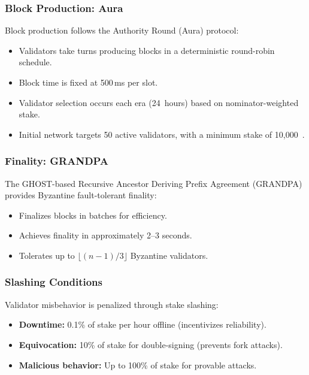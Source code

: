 \subsubsection{Block Production: Aura}

Block production follows the Authority Round (Aura) protocol:
\begin{itemize}[nosep]
    \item Validators take turns producing blocks in a deterministic round-robin schedule.
    \item Block time is fixed at 500\,ms per slot.
    \item Validator selection occurs each era (24~hours) based on nominator-weighted stake.
    \item Initial network targets 50 active validators, with a minimum stake of 10{,}000~\clawtoken{}.
\end{itemize}

\subsubsection{Finality: GRANDPA}

The GHOST-based Recursive Ancestor Deriving Prefix Agreement (GRANDPA)~\citep{grandpa2020} provides Byzantine fault-tolerant finality:
\begin{itemize}[nosep]
    \item Finalizes blocks in batches for efficiency.
    \item Achieves finality in approximately 2--3 seconds.
    \item Tolerates up to $\lfloor (n-1)/3 \rfloor$ Byzantine validators.
\end{itemize}

\subsubsection{Slashing Conditions}

Validator misbehavior is penalized through stake slashing:
\begin{itemize}[nosep]
    \item \textbf{Downtime:} 0.1\% of stake per hour offline (incentivizes reliability).
    \item \textbf{Equivocation:} 10\% of stake for double-signing (prevents fork attacks).
    \item \textbf{Malicious behavior:} Up to 100\% of stake for provable attacks.
\end{itemize}

